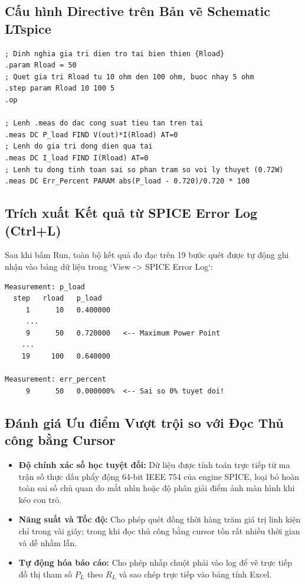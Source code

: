\documentclass[12pt,a4paper]{report}
\begin{document}
\subsection{Cấu hình Directive trên Bản vẽ Schematic LTspice}
\begin{lstlisting}[language=TeX,caption={Directive tự động quét tham số và tính toán sai số trong LTspice}]
; Dinh nghia gia tri dien tro tai bien thien {Rload}
.param Rload = 50
; Quet gia tri Rload tu 10 ohm den 100 ohm, buoc nhay 5 ohm
.step param Rload 10 100 5
.op

; Lenh .meas do dac cong suat tieu tan tren tai
.meas DC P_load FIND V(out)*I(Rload) AT=0
; Lenh do gia tri dong dien qua tai
.meas DC I_load FIND I(Rload) AT=0
; Lenh tu dong tinh toan sai so phan tram so voi ly thuyet (0.72W)
.meas DC Err_Percent PARAM abs(P_load - 0.720)/0.720 * 100
\end{lstlisting}

\subsection{Trích xuất Kết quả từ SPICE Error Log (Ctrl+L)}
Sau khi bấm Run, toàn bộ kết quả đo đạc trên 19 bước quét được tự động ghi nhận vào bảng dữ liệu trong `View -> SPICE Error Log`:
\begin{verbatim}
Measurement: p_load
  step   rload   p_load
     1      10   0.400000
     ...
     9      50   0.720000   <-- Maximum Power Point
    ...
    19     100   0.640000

Measurement: err_percent
     9      50   0.000000%  <-- Sai so 0% tuyet doi!
\end{verbatim}

\subsection{Đánh giá Ưu điểm Vượt trội so với Đọc Thủ công bằng Cursor}
\begin{itemize}[noitemsep]
    \item \textbf{Độ chính xác số học tuyệt đối:} Dữ liệu được tính toán trực tiếp từ ma trận số thực dấu phẩy động 64-bit IEEE 754 của engine SPICE, loại bỏ hoàn toàn sai số chủ quan do mắt nhìn hoặc độ phân giải điểm ảnh màn hình khi kéo con trỏ.
    \item \textbf{Năng suất và Tốc độ:} Cho phép quét đồng thời hàng trăm giá trị linh kiện chỉ trong vài giây; trong khi đọc thủ công bằng cursor tốn rất nhiều thời gian và dễ nhầm lẫn.
    \item \textbf{Tự động hóa báo cáo:} Cho phép nhấp chuột phải vào log để vẽ trực tiếp đồ thị tham số $P_L$ theo $R_L$ và sao chép trực tiếp vào bảng tính Excel.
\end{itemize}
\end{document}
